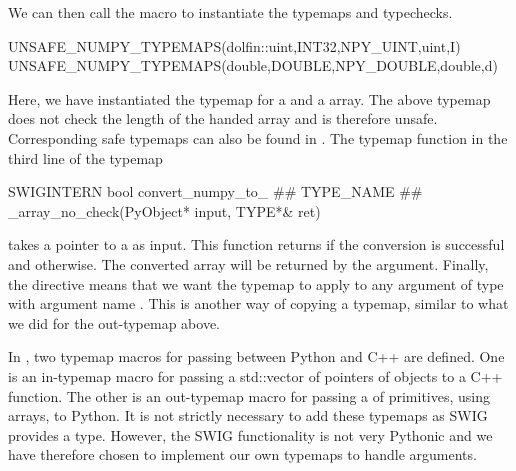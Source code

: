 We can then call the macro to instantiate the typemaps and typechecks.
\begin{c++}
UNSAFE_NUMPY_TYPEMAPS(dolfin::uint,INT32,NPY_UINT,uint,I)
UNSAFE_NUMPY_TYPEMAPS(double,DOUBLE,NPY_DOUBLE,double,d)
\end{c++}
Here, we have instantiated the typemap for a  and a
 array. The above typemap does not check the length of the handed \numpy array 
and is therefore unsafe. Corresponding safe typemaps can also be found in
. 
The typemap function in the third line of the typemap
\begin{c++}
  SWIGINTERN bool convert_numpy_to_ ## TYPE_NAME ## _array_no_check(PyObject* input, TYPE*& ret)
\end{c++}
takes a pointer to a  as input. This function returns
 if the conversion is successful and  otherwise. The
converted array will be returned by the  argument. 
Finally, the  directive means that we want the typemap to apply to any argument of type  with argument name . This is another way of copying a typemap, similar to what we did for the  out-typemap above.

In , two typemap macros for passing
 between Python and C++ are defined. One is an
in-typemap macro for passing a std::vector of pointers of \dolfin objects
to a C++ function. The other is an out-typemap macro for passing a
 of primitives, using \numpy arrays, to Python. It is not
strictly necessary to add these typemaps as SWIG provides a
 type. However, the SWIG  functionality
is not very Pythonic and we have therefore chosen to implement our own typemaps to handle  arguments.

